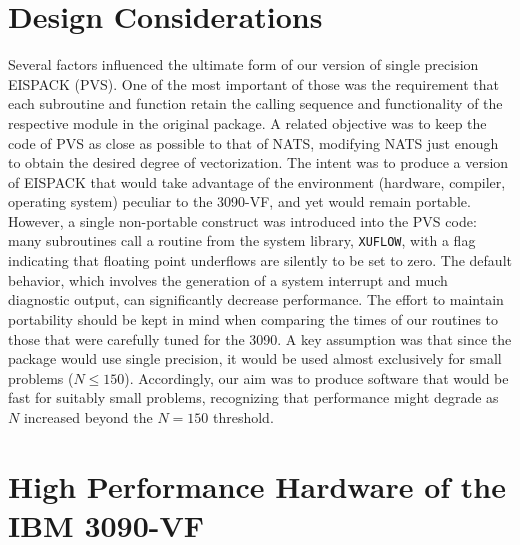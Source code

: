 \section{Design Considerations}

Several factors influenced the ultimate form of our version
of single precision EISPACK (PVS).
One of the most important of those was the requirement that each subroutine
and function retain the calling sequence and functionality of the respective
module in the original package.
A related objective was to keep the code of PVS as close as possible to that
of NATS, modifying NATS just enough to obtain the desired degree of
vectorization.
The intent was to produce a version of EISPACK that would take advantage of
the environment (hardware, compiler, operating system) peculiar to the 3090-VF,
and yet would remain portable.
However, a single non-portable construct was introduced into the
PVS code: many subroutines call a routine from the system library,
{\tt XUFLOW}, with a flag indicating that floating point underflows
are silently to be set to zero.
The default behavior, which involves the generation of a system interrupt and
much diagnostic output, can significantly decrease performance.
The effort to maintain portability should be kept in mind when comparing
the times of our routines to those that were carefully tuned for the 3090.
A key assumption was that since the package would use single precision,
it would be used almost exclusively for small problems ($N \leq 150$).
Accordingly, our aim was to produce software that would be fast for suitably
small problems, recognizing that performance might degrade as $N$ increased
beyond the $N = 150$ threshold.

\section{High Performance Hardware of the IBM 3090-VF}

